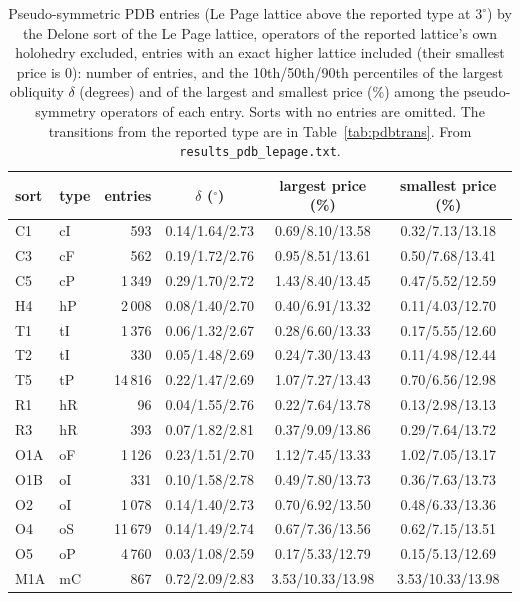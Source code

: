 \documentclass[preprint,pdf]{iucr}          %
\begin{document}
\begin{table}
\caption{Pseudo-symmetric PDB entries (Le Page lattice above the reported type at $3^\circ$) by the Delone sort of the Le Page lattice, operators of the reported lattice's own holohedry excluded, entries with an exact higher lattice included (their smallest price is $0$): number of entries, and the 10th/50th/90th percentiles of the largest obliquity $\delta$ (degrees) and of the largest and smallest price (\%) among the pseudo-symmetry operators of each entry. Sorts with no entries are omitted. The transitions from the reported type are in Table~\ref{tab:pdbtrans}. From \texttt{results\_pdb\_lepage.txt}.}
\label{tab:pdbsort}
\begin{footnotesize}
\begin{tabular}{llrccc}
\toprule
sort & type & entries & $\delta$ ($^\circ$) & largest price (\%) & smallest price (\%) \\
\midrule
C1 & cI & 593 & 0.14/1.64/2.73 & 0.69/8.10/13.58 & 0.32/7.13/13.18 \\
C3 & cF & 562 & 0.19/1.72/2.76 & 0.95/8.51/13.61 & 0.50/7.68/13.41 \\
C5 & cP & 1\,349 & 0.29/1.70/2.72 & 1.43/8.40/13.45 & 0.47/5.52/12.59 \\
H4 & hP & 2\,008 & 0.08/1.40/2.70 & 0.40/6.91/13.32 & 0.11/4.03/12.70 \\
T1 & tI & 1\,376 & 0.06/1.32/2.67 & 0.28/6.60/13.33 & 0.17/5.55/12.60 \\
T2 & tI & 330 & 0.05/1.48/2.69 & 0.24/7.30/13.43 & 0.11/4.98/12.44 \\
T5 & tP & 14\,816 & 0.22/1.47/2.69 & 1.07/7.27/13.43 & 0.70/6.56/12.98 \\
R1 & hR & 96 & 0.04/1.55/2.76 & 0.22/7.64/13.78 & 0.13/2.98/13.13 \\
R3 & hR & 393 & 0.07/1.82/2.81 & 0.37/9.09/13.86 & 0.29/7.64/13.72 \\
O1A & oF & 1\,126 & 0.23/1.51/2.70 & 1.12/7.45/13.33 & 1.02/7.05/13.17 \\
O1B & oI & 331 & 0.10/1.58/2.78 & 0.49/7.80/13.73 & 0.36/7.63/13.73 \\
O2 & oI & 1\,078 & 0.14/1.40/2.73 & 0.70/6.92/13.50 & 0.48/6.33/13.36 \\
O4 & oS & 11\,679 & 0.14/1.49/2.74 & 0.67/7.36/13.56 & 0.62/7.15/13.51 \\
O5 & oP & 4\,760 & 0.03/1.08/2.59 & 0.17/5.33/12.79 & 0.15/5.13/12.69 \\
M1A & mC & 867 & 0.72/2.09/2.83 & 3.53/10.33/13.98 & 3.53/10.33/13.98 \\

\end{tabular}
\end{footnotesize}
\end{table}
\end{document}
